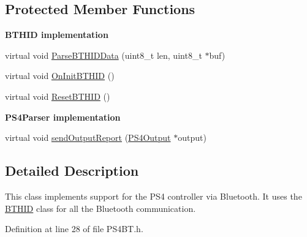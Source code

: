 \subsection*{\-Protected \-Member \-Functions}
\begin{Indent}{\bf \-B\-T\-H\-I\-D implementation}\par
\begin{DoxyCompactItemize}
\item 
virtual void \hyperlink{class_p_s4_b_t_a0d92689d0c24e62ddc7a1b3c4c658512}{\-Parse\-B\-T\-H\-I\-D\-Data} (uint8\-\_\-t len, uint8\-\_\-t $\ast$buf)
\item 
virtual void \hyperlink{class_p_s4_b_t_a91088a6ed093d3cebb82d8f5e208304b}{\-On\-Init\-B\-T\-H\-I\-D} ()
\item 
virtual void \hyperlink{class_p_s4_b_t_a4b1c9e15ccdc7ab24f7fb42fc9b5d827}{\-Reset\-B\-T\-H\-I\-D} ()
\end{DoxyCompactItemize}
\end{Indent}
\begin{Indent}{\bf \-P\-S4\-Parser implementation}\par
\begin{DoxyCompactItemize}
\item 
virtual void \hyperlink{class_p_s4_b_t_ad3bb50902905677726bd62d5f394b062}{send\-Output\-Report} (\hyperlink{struct_p_s4_output}{\-P\-S4\-Output} $\ast$output)
\end{DoxyCompactItemize}
\end{Indent}


\subsection{\-Detailed \-Description}
\-This class implements support for the \-P\-S4 controller via \-Bluetooth. \-It uses the \hyperlink{class_b_t_h_i_d}{\-B\-T\-H\-I\-D} class for all the \-Bluetooth communication. 

\-Definition at line 28 of file \-P\-S4\-B\-T.\-h.



